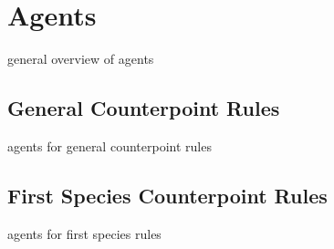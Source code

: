 \section{Agents}

general overview of agents

\subsection{General Counterpoint Rules}

agents for general counterpoint rules

\subsection{First Species Counterpoint Rules}

agents for first species rules
